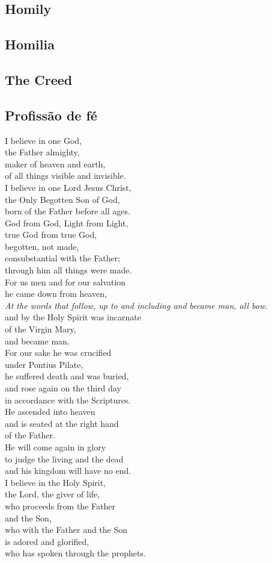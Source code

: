 \documentclass[10pt,a5]{article}
\newcommand \subsect[2] {\subsection*{#1} \switchcolumn \subsection*{#2} \switchcolumn*}
\begin{document}
 \clearpage

\begin{paracol}{2}
 \subsect{Homily}{Homilia}

 \subsect{The Creed}{Profiss\~ao de f\'e}
I believe in one God,\\
the Father almighty,\\
maker of heaven and earth,\\
of all things visible and invisible.\\

\noindent
I believe in one Lord Jesus Christ,\\
the Only Begotten Son of God,\\
born of the Father before all ages.\\
God from God, Light from Light,\\
true God from true God,\\
begotten, not made,\\
consubstantial with the Father;\\
through him all things were made.\\
For us men and for our salvation\\
he came down from heaven,\\
{\tiny\textit{ At the words that follow, up to and including and became man, all bow.}}\\
and by the Holy Spirit was incarnate\\
of the Virgin Mary,\\
and became man.\\
For our sake he was crucified\\
under Pontius Pilate,\\
he suffered death and was buried,\\
and rose again on the third day\\
in accordance with the Scriptures.\\
He ascended into heaven\\
and is seated at the right hand\\
of the Father.\\
He will come again in glory\\
to judge the living and the dead\\
and his kingdom will have no end.\\

\noindent
I believe in the Holy Spirit,\\
the Lord, the giver of life,\\
who proceeds from the Father\\
and the Son,\\
who with the Father and the Son\\
is adored and glorified,\\
who has spoken through the prophets.\\


\end{paracol}
\end{document}
